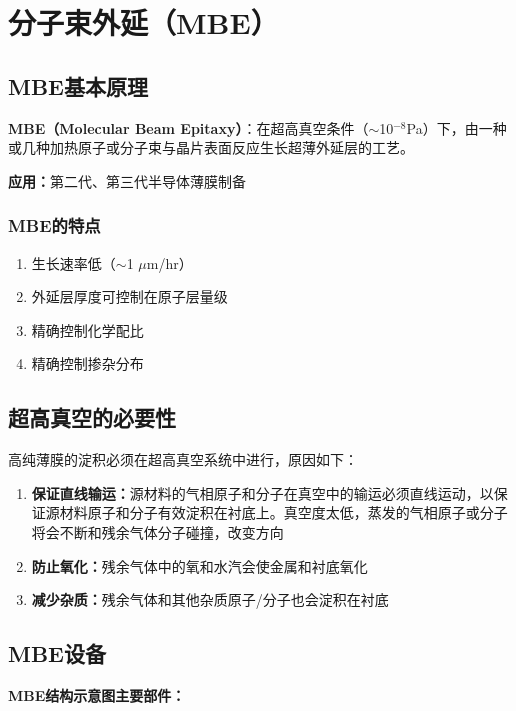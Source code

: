 \documentclass[UTF8,12pt,a4paper]{ctexart}
\begin{document}
\section{分子束外延（MBE）}

\subsection{MBE基本原理}

\textbf{MBE（Molecular Beam Epitaxy）}：在超高真空条件（$\sim$10$^{-8}$Pa）下，由一种或几种加热原子或分子束与晶片表面反应生长超薄外延层的工艺。

\textbf{应用：}第二代、第三代半导体薄膜制备

\subsubsection{MBE的特点}

\begin{enumerate}
    \item 生长速率低（$\sim$1 $\mu$m/hr）
    \item 外延层厚度可控制在原子层量级
    \item 精确控制化学配比
    \item 精确控制掺杂分布
\end{enumerate}

\subsection{超高真空的必要性}

高纯薄膜的淀积必须在超高真空系统中进行，原因如下：

\begin{enumerate}
    \item \textbf{保证直线输运：}源材料的气相原子和分子在真空中的输运必须直线运动，以保证源材料原子和分子有效淀积在衬底上。真空度太低，蒸发的气相原子或分子将会不断和残余气体分子碰撞，改变方向
    \item \textbf{防止氧化：}残余气体中的氧和水汽会使金属和衬底氧化
    \item \textbf{减少杂质：}残余气体和其他杂质原子/分子也会淀积在衬底
\end{enumerate}

\subsection{MBE设备}

\textbf{MBE结构示意图主要部件：}
\end{document}
